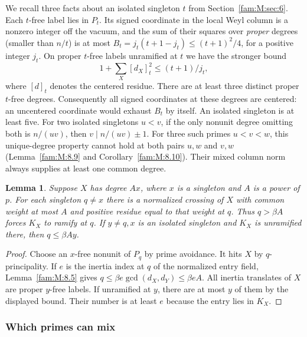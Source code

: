 \documentclass[11pt,a4paper]{article}
\numberwithin{equation}{section}
\newtheorem{lemma}[theorem]{Lemma}
\theoremstyle{remark}
\begin{document}
We recall three facts about an isolated singleton $t$ from Section~\ref{fam:M:sec:6}. Each $t$-free label lies in $P_t$. Its signed coordinate in the local Weyl column is a nonzero integer off the vacuum, and the sum of their squares over \emph{proper} degrees (smaller than $n/t$) is at most $B_t=j_t(t+1-j_t)\le(t+1)^2/4$, for a positive integer $j_t$. On proper $t$-free labels unramified at $t$ we have the stronger bound
\[
             1+\sum_X [d_X]_t^2\le (t+1)/j_t ,
\]
where $[d]_t$ denotes the centered residue. There are at least three distinct proper $t$-free degrees. Consequently all signed coordinates at these degrees are centered: an uncentered coordinate would exhaust $B_t$ by itself. An isolated singleton is at least five. For two isolated singletons $u<v$, if the only nonunit degree omitting both is $n/(uv)$, then $v\mid n/(uv)\pm1$. For three such primes $u<v<w$, this unique-degree property cannot hold at both pairs $u,w$ and $v,w$ (Lemma~\ref{fam:M:8.9} and Corollary~\ref{fam:M:8.10}). Their mixed column norm always supplies at least one common degree.

\begin{lemma}\label{fam:F:5.2}\label{fam:F:n:cost}
Suppose $X$ has degree $A x$, where $x$ is a singleton and $A$ is a power of $p$. For each singleton $q\ne x$ there is a normalized crossing of $X$ with common weight at most $A$ and positive residue equal to that weight at $q$. Thus $q>\beta A$ forces $K_X$ to ramify at $q$. If $y\ne q,x$ is an isolated singleton and $K_X$ is unramified there, then $q\le\beta A y$.
\end{lemma}
\begin{proof}
Choose an $x$-free nonunit of $P_q$ by prime avoidance. It hits $X$ by $q$-principality. If $e$ is the inertia index at $q$ of the normalized entry field, Lemma~\ref{fam:M:8.5} gives $q\le\beta e\gcd(d_X,d_Y)\le\beta eA$. All inertia translates of $X$ are proper $y$-free labels. If unramified at $y$, there are at most $y$ of them by the displayed bound. Their number is at least $e$ because the entry lies in $K_X$.
\end{proof}

\subsubsection{Which primes can mix}\label{fam:F:sec:5.1}
\end{document}
